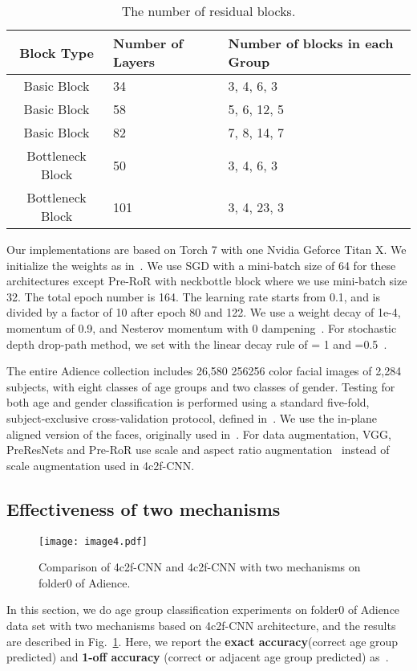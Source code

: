 \documentclass[journal]{IEEEtran}
\begin{document}
\par
\begin{table}[h]
\caption{The number of residual blocks.}
\centering
\begin{tabular}{|c|p{1.5cm}|p{3cm}|}
\hline
Block Type       &Number of Layers   &Number of blocks in each Group   \\ 
\hline\hline
Basic Block      &34         &{3, 4, 6, 3}    \\
\hline
Basic Block  &58         &{5, 6, 12, 5}   \\
\hline
Basic Block  &82         &{7, 8, 14, 7}  \\
\hline
Bottleneck Block &50         &{3, 4, 6, 3}   \\
\hline
Bottleneck Block &101        &{3, 4, 23, 3}   \\
\hline
\end{tabular}

\label{tab:tab6}
\end{table}
Our implementations are based on Torch 7 with one Nvidia Geforce Titan X. We initialize the weights as in~\cite{ResNet}. We use SGD with a mini-batch size of 64 for these architectures except Pre-RoR with neckbottle block where we use mini-batch size 32. The total epoch number is 164. The learning rate starts from 0.1, and is divided by a factor of 10 after epoch 80 and 122. We use a weight decay of 1e-4, momentum of 0.9, and Nesterov momentum with 0 dampening~\cite{gross2016facebookres}. For stochastic depth drop-path method, we set  with the linear decay rule of = 1 and =0.5~\cite{huang2016SD}.
\par 
The entire Adience collection includes 26,580 256256 color facial images of 2,284 subjects, with eight classes of age groups and two classes of gender. Testing for both age and gender classification is performed using a standard five-fold, subject-exclusive cross-validation protocol, defined in~\cite{AgeSVMdrop}. We use the in-plane aligned version of the faces, originally used in~\cite{hassner2015effective}. For data augmentation, VGG, PreResNets and Pre-RoR use scale and aspect ratio augmentation~\cite{gross2016facebookres} instead of scale augmentation used in 4c2f-CNN.

\subsection{Effectiveness of two mechanisms}
\begin{figure}
\centering
\texttt{[image: image4.pdf]}
\caption{Comparison of 4c2f-CNN and 4c2f-CNN with two mechanisms on folder0 of Adience.}
\label{fig:image4}
\end{figure}
In this section, we do age group classification experiments on folder0 of Adience data set with two mechanisms based on 4c2f-CNN architecture, and the results are described in Fig.~\ref{fig:image4}. Here, we report the \textbf{exact accuracy}(correct age group predicted) and \textbf{1-off accuracy} (correct or adjacent age group predicted) as~\cite{AgeSVMdrop}.
\end{document}
